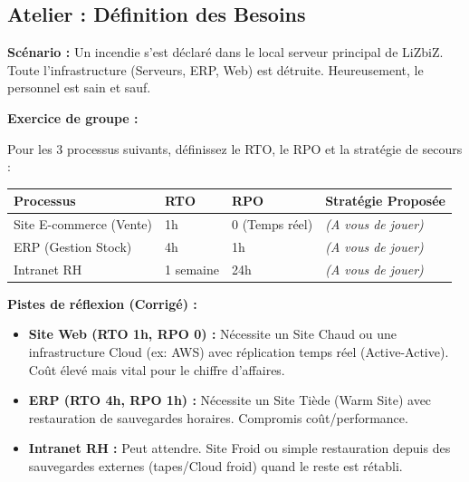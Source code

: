 \subsection{Atelier : Définition des Besoins}

\begin{boxlizbiz}
\textbf{Scénario :} Un incendie s'est déclaré dans le local serveur principal de LiZbiZ. Toute l'infrastructure (Serveurs, ERP, Web) est détruite. Heureusement, le personnel est sain et sauf.
\end{boxlizbiz}

\textbf{Exercice de groupe :}

Pour les 3 processus suivants, définissez le RTO, le RPO et la stratégie de secours :

\begin{table}[htbp]
\centering
\small
\begin{tabular}{p{3cm}p{2cm}p{2cm}p{5cm}}
    \toprule
    \textbf{Processus} & \textbf{RTO} & \textbf{RPO} & \textbf{Stratégie Proposée} \\
    \midrule
    Site E-commerce (Vente) & 1h & 0 (Temps réel) & \textit{(A vous de jouer)} \\
    ERP (Gestion Stock) & 4h & 1h & \textit{(A vous de jouer)} \\
    Intranet RH & 1 semaine & 24h & \textit{(A vous de jouer)} \\
    \bottomrule
\end{tabular}
\end{table}

\textbf{Pistes de réflexion (Corrigé) :}
\begin{itemize}
    \item \textbf{Site Web (RTO 1h, RPO 0) :} Nécessite un Site Chaud ou une infrastructure Cloud (ex: AWS) avec réplication temps réel (Active-Active). Coût élevé mais vital pour le chiffre d'affaires.
    \item \textbf{ERP (RTO 4h, RPO 1h) :} Nécessite un Site Tiède (Warm Site) avec restauration de sauvegardes horaires. Compromis coût/performance.
    \item \textbf{Intranet RH :} Peut attendre. Site Froid ou simple restauration depuis des sauvegardes externes (tapes/Cloud froid) quand le reste est rétabli.
\end{itemize}

